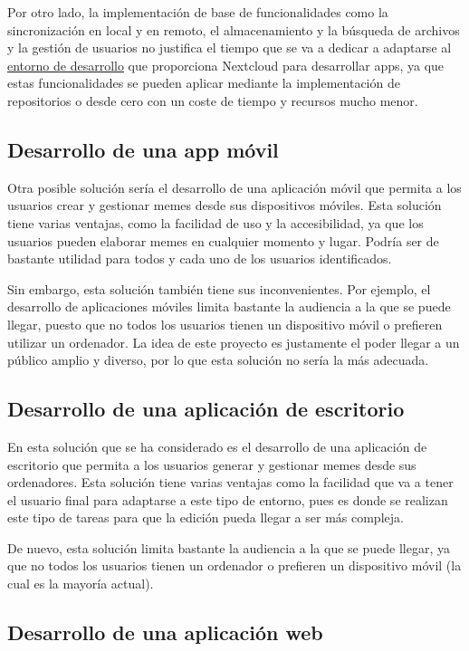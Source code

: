 Por otro lado, la implementación de base de funcionalidades como la sincronización en local y en remoto, el almacenamiento y la búsqueda de archivos y la gestión de usuarios no justifica el tiempo que se va a dedicar a adaptarse al \href{https://nextcloud.com/developer/}{entorno de desarrollo} que proporciona Nextcloud para desarrollar apps, ya que estas funcionalidades se pueden aplicar mediante la implementación de repositorios o desde cero con un coste de tiempo y recursos mucho menor. 

\subsection{Desarrollo de una app móvil}

Otra posible solución sería el desarrollo de una aplicación móvil que permita a los usuarios crear y gestionar memes desde sus dispositivos móviles. Esta solución tiene varias ventajas, como la facilidad de uso y la accesibilidad, ya que los usuarios pueden elaborar memes en cualquier momento y lugar. Podría ser de bastante utilidad para todos y cada uno de los usuarios identificados.

Sin embargo, esta solución también tiene sus inconvenientes. Por ejemplo, el desarrollo de aplicaciones móviles limita bastante la audiencia a la que se puede llegar, puesto que no todos los usuarios tienen un dispositivo móvil o prefieren utilizar un ordenador. La idea de este proyecto es justamente el poder llegar a un público amplio y diverso, por lo que esta solución no sería la más adecuada.

\subsection{Desarrollo de una aplicación de escritorio}

En esta solución que se ha considerado es el desarrollo de una aplicación de escritorio que permita a los usuarios generar y gestionar memes desde sus ordenadores. Esta solución tiene varias ventajas como la facilidad que va a tener el usuario final para adaptarse a este tipo de entorno, pues es donde se realizan este tipo de tareas para que la edición pueda llegar a ser más compleja.

De nuevo, esta solución limita bastante la audiencia a la que se puede llegar, ya que no todos los usuarios tienen un ordenador o prefieren un dispositivo móvil (la cual es la mayoría actual).

\subsection{Desarrollo de una aplicación web}

